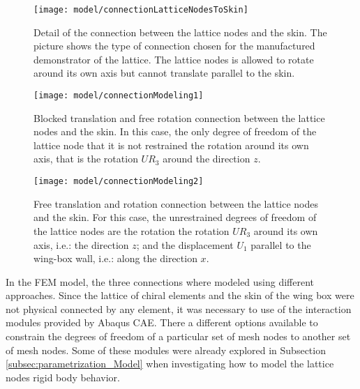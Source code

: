     \begin{figure}[!htpb]
      \centering
      \texttt{[image: model/connectionLatticeNodesToSkin]}
      \caption[Detail of the connection between the lattice nodes and the skin]{Detail of the connection between the lattice nodes and the skin. The picture shows the type of connection chosen for the manufactured demonstrator of the lattice. The lattice nodes is allowed to rotate around its own axis but cannot translate parallel to the skin. \cite{Vincenz2017}}\label{fig:connectionLatticeNodesToSkin}
    \end{figure}

    \begin{figure}[!htpb]
      \centering
      \texttt{[image: model/connectionModeling1]}
      \caption[Blocked translation and free rotation connection between the lattice nodes and the skin]{Blocked translation and free rotation connection between the lattice nodes and the skin. In this case, the only degree of freedom of the lattice node that it is not restrained the rotation around its own axis, that is the rotation $UR_3$ around the direction $z$.}\label{fig:connectionModeling1}
    \end{figure}

    \begin{figure}[!htpb]
      \centering
      \texttt{[image: model/connectionModeling2]}
      \caption[Free translation and rotation connection between the lattice nodes and the skin]{Free translation and rotation connection between the lattice nodes and the skin. For this case, the unrestrained degrees of freedom of the lattice nodes are the rotation the rotation $UR_3$ around its own axis, i.e.: the direction $z$; and the displacement $U_1$ parallel to the wing-box wall, i.e.: along the direction $x$.}\label{fig:connectionModeling2}
    \end{figure}

    In the FEM model, the three connections where modeled using different approaches. Since the lattice of chiral elements and the skin of the wing box were not physical connected by any element, it was necessary to use of the interaction modules provided by Abaqus CAE. There a different options available to constrain the degrees of freedom of a particular set of mesh nodes to another set of mesh nodes. Some of these modules were already explored in Subsection \ref{subsec:parametrization_Model} when investigating how to model the lattice nodes rigid body behavior.


